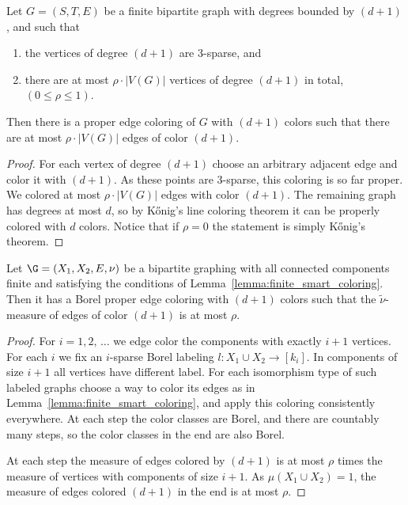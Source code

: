 \begin{lemm}\label{lemma:finite_smart_coloring}
Let $G=(S,T,E)$ be a finite bipartite graph with degrees bounded by $(d+1)$, and such that
\begin{enumerate}
\item \label{condition:bad_points_sparse}
the vertices of degree $(d+1)$ are 3-sparse, and
\item there are at most $\rho \cdot |V(G)|$ vertices of degree $(d+1)$ in total, $(0 \leq \rho \leq 1)$.
\end{enumerate}
Then there is a proper edge coloring of $G$ with $(d+1)$ colors such that there are at most $\rho \cdot |V(G)|$ edges of color $(d+1)$.
\end{lemm}

\begin{proof}
For each vertex of degree $(d+1)$ choose an arbitrary adjacent edge and color it with $(d+1)$. As these points are 3-sparse, this coloring is so far proper. We colored at most $\rho \cdot |V(G)|$ edges with color $(d+1)$. The remaining graph has degrees at most $d$, so by Kőnig's line coloring theorem it can be properly colored with $d$ colors. Notice that if $\rho=0$ the statement is simply Kőnig's theorem.
\end{proof}


\begin{lemm}\label{lemma:finite_components_smart_coloring}
Let $\G=(X_1,X_2,E, \nu)$ be a bipartite graphing with all connected components finite and satisfying the conditions of Lemma~\ref{lemma:finite_smart_coloring}. Then it has a Borel proper edge coloring with $(d+1)$ colors such that the $\widetilde{\nu}$-measure of edges of color $(d+1)$ is at most $\rho$.
\end{lemm}

\begin{proof}
For $i=1,2,\,\dots$ we edge color the components with exactly $i+1$ vertices. For each $i$ we fix an $i$-sparse Borel labeling $l: X_1 \cup X_2 \to [k_i]$. In components of size $i+1$ all vertices have different label. For each isomorphism type of such labeled graphs choose a way to color its edges as in Lemma~\ref{lemma:finite_smart_coloring}, and apply this coloring consistently everywhere. At each step the color classes are Borel, and there are countably many steps, so the color classes in the end are also Borel.

At each step the measure of edges colored by $(d+1)$ is at most $\rho$ times the measure of vertices with components of size $i+1$. As $\mu(X_1 \cup X_2) = 1$, the measure of edges colored $(d+1)$ in the end is at most $\rho$.
\end{proof}

